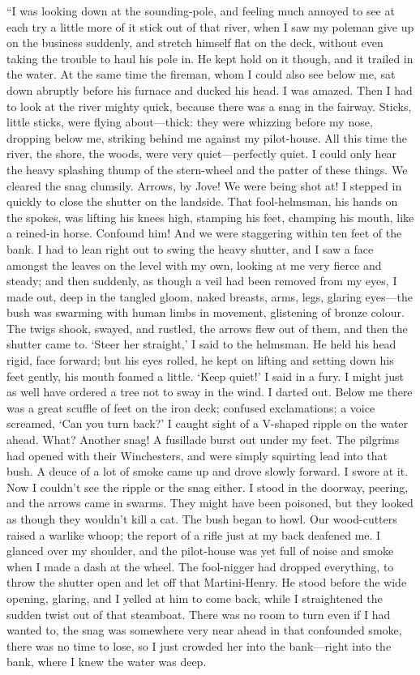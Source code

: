 \documentclass[12pt]{report}
\begin{document}
``I was looking down at the sounding-pole, and feeling much annoyed to
see at each try a little more of it stick out of that river, when I saw
my poleman give up on the business suddenly, and stretch himself flat on
the deck, without even taking the trouble to haul his pole in. He kept
hold on it though, and it trailed in the water. At the same time the
fireman, whom I could also see below me, sat down abruptly before his
furnace and ducked his head. I was amazed. Then I had to look at the
river mighty quick, because there was a snag in the fairway. Sticks,
little sticks, were flying about---thick: they were whizzing before my
nose, dropping below me, striking behind me against my pilot-house. All
this time the river, the shore, the woods, were very quiet---perfectly
quiet. I could only hear the heavy splashing thump of the stern-wheel
and the patter of these things. We cleared the snag clumsily. Arrows, by
Jove! We were being shot at! I stepped in quickly to close the shutter
on the landside. That fool-helmsman, his hands on the spokes, was
lifting his knees high, stamping his feet, champing his mouth, like a
reined-in horse. Confound him! And we were staggering within ten feet of
the bank. I had to lean right out to swing the heavy shutter, and I saw
a face amongst the leaves on the level with my own, looking at me very
fierce and steady; and then suddenly, as though a veil had been removed
from my eyes, I made out, deep in the tangled gloom, naked breasts,
arms, legs, glaring eyes---the bush was swarming with human limbs in
movement, glistening of bronze colour. The twigs shook, swayed, and
rustled, the arrows flew out of them, and then the shutter came to.
`Steer her straight,' I said to the helmsman. He held his head rigid,
face forward; but his eyes rolled, he kept on lifting and setting down
his feet gently, his mouth foamed a little. `Keep quiet!' I said in a
fury. I might just as well have ordered a tree not to sway in the wind.
I darted out. Below me there was a great scuffle of feet on the iron
deck; confused exclamations; a voice screamed, `Can you turn back?' I
caught sight of a V-shaped ripple on the water ahead. What? Another
snag! A fusillade burst out under my feet. The pilgrims had opened with
their Winchesters, and were simply squirting lead into that bush. A
deuce of a lot of smoke came up and drove slowly forward. I swore at it.
Now I couldn't see the ripple or the snag either. I stood in the
doorway, peering, and the arrows came in swarms. They might have been
poisoned, but they looked as though they wouldn't kill a cat. The bush
began to howl. Our wood-cutters raised a warlike whoop; the report of a
rifle just at my back deafened me. I glanced over my shoulder, and the
pilot-house was yet full of noise and smoke when I made a dash at the
wheel. The fool-nigger had dropped everything, to throw the shutter open
and let off that Martini-Henry. He stood before the wide opening,
glaring, and I yelled at him to come back, while I straightened the
sudden twist out of that steamboat. There was no room to turn even if I
had wanted to, the snag was somewhere very near ahead in that confounded
smoke, there was no time to lose, so I just crowded her into the
bank---right into the bank, where I knew the water was deep.
\end{document}
